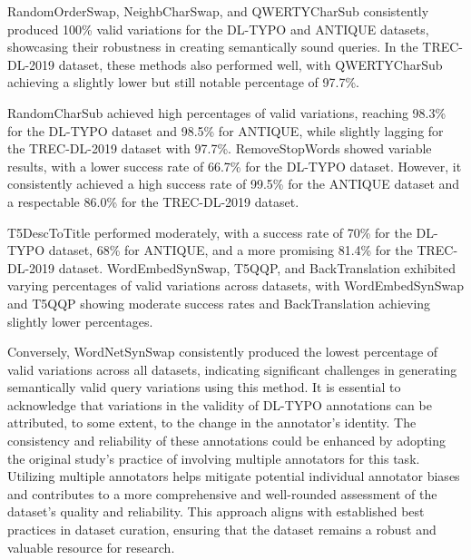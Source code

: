 RandomOrderSwap, NeighbCharSwap, and QWERTYCharSub consistently produced 100\% valid variations for the DL-TYPO and ANTIQUE datasets, showcasing their robustness in creating semantically sound queries. In the TREC-DL-2019 dataset, these methods also performed well, with QWERTYCharSub achieving a slightly lower but still notable percentage of 97.7\%.

RandomCharSub achieved high percentages of valid variations, reaching 98.3\% for the DL-TYPO dataset and 98.5\% for ANTIQUE, while slightly lagging for the TREC-DL-2019 dataset with 97.7\%. RemoveStopWords showed variable results, with a lower success rate of 66.7\% for the DL-TYPO dataset. However, it consistently achieved a high success rate of 99.5\% for the ANTIQUE dataset and a respectable 86.0\% for the TREC-DL-2019 dataset.

T5DescToTitle performed moderately, with a success rate of 70\% for the DL-TYPO dataset, 68\% for ANTIQUE, and a more promising 81.4\% for the TREC-DL-2019 dataset. WordEmbedSynSwap, T5QQP, and BackTranslation exhibited varying percentages of valid variations across datasets, with WordEmbedSynSwap and T5QQP showing moderate success rates and BackTranslation achieving slightly lower percentages.

Conversely, WordNetSynSwap consistently produced the lowest percentage of valid variations across all datasets, indicating significant challenges in generating semantically valid query variations using this method. It is essential to acknowledge that variations in the validity of DL-TYPO annotations can be attributed, to some extent, to the change in the annotator's identity. The consistency and reliability of these annotations could be enhanced by adopting the original study's practice of involving multiple annotators for this task. Utilizing multiple annotators helps mitigate potential individual annotator biases and contributes to a more comprehensive and well-rounded assessment of the dataset's quality and reliability. This approach aligns with established best practices in dataset curation, ensuring that the dataset remains a robust and valuable resource for research.